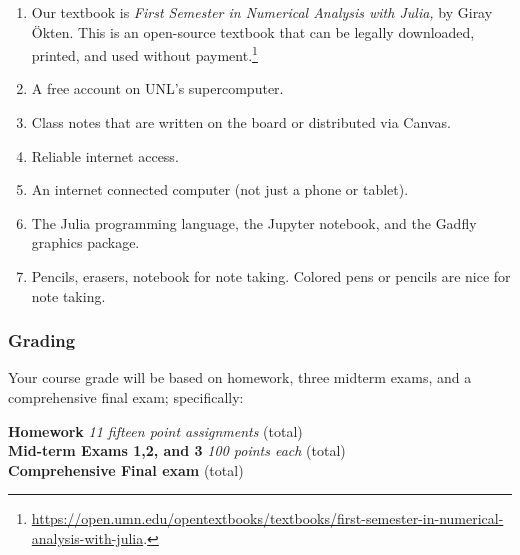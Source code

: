 \documentclass[12pt,fullpage]{article}
\newcounter{ex}\setcounter{ex}{0}
\newenvironment{mypar}[2]
  {\begin{list}{}%
    {\setlength\leftmargin{#1}
    \setlength\rightmargin{#2}}
    \item[]}
  {\end{list}}
\begin{document}
\begin{enumerate}

\item Our textbook is \emph{First Semester in Numerical Analysis with Julia,} by Giray Ökten.  This is an open-source 
textbook that can be legally downloaded, printed, and  used without 
payment.\footnote{ \url{https://open.umn.edu/opentextbooks/textbooks/first-semester-in-numerical-analysis-with-julia}.  \normalsize} 

\item A free account on UNL's supercomputer.

\item Class notes that are written on the board or distributed via Canvas.

\item Reliable internet access.

\item  An internet connected computer (not just a phone or tablet). 

\item The Julia programming language, the Jupyter notebook, and the Gadfly
      graphics package.

\item Pencils, erasers, notebook for note taking. Colored pens or pencils are nice 
for note taking.


 \end{enumerate}


\subsubsection*{Grading}
 Your course grade will be based on homework, three midterm exams, and a 
 comprehensive final exam; specifically:
 \begin{mypar}{0.25in}{0.25in}
       \textbf{Homework}  \emph{11 fifteen point assignments}   (total) \\
       \textbf{Mid-term Exams 1,2, and 3} \emph{100 points each}  (total)\\
          \textbf{Comprehensive Final exam}  (total)
 \end{mypar}

 
 
 
 
\end{document}
